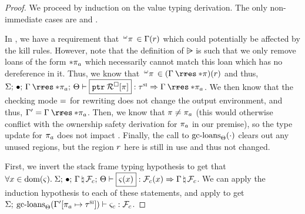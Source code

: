 \begin{proof}
  We proceed by induction on the value typing derivation. The only non-immediate
  cases are  and .

  \vspace{1em}
  \noindent \framebox[\textwidth]{ \figuresize
    \begin{mathpar}
      \TPointer
    \end{mathpar}
  } \vspace{1em}

  In , we have a requirement that
  $\,^{\omega}\pi\, \in \Gamma(r)$ which could
  potentially be affected by the kill rules. However, note that the definition
  of $\rsub$ is such that we only remove loans of the form
  $* \pi_a$ which necessarily cannot match this loan which has no
  dereference in it. Thus, we know that $\oxloanpkg{\oxmuta}{\oxplace} \in
  (\oxrsub{\oxvarctx}{\oxderef{\oxplace}})(\oxcprov)$ and thus,
  $\oxtypjudge{\oxglobalctx}{\oxemptyctx}{\oxkontctx}{
    \oxrsub{\oxvarctx}{\oxderef{\oxplace_a}}
  }{
    \oxptr{\oxreferentctx[\oxplace]}
  }{\oxsitype}{
    \oxrsub{\oxvarctx}{\oxderef{\oxplace_a}}
  }$. We then know that the checking mode $=$ for rewriting does not
  change the output environment, and thus, $\oxvarctx^\prime =
  \oxrsub{\oxvarctx}{\oxderef{\oxplace_a}}$. Then, we know that
  $\pi \neq \pi_a$ (this would otherwise conflict with the ownership
  safety derivation for $\pi_a$ in our premise), so the type update for
  $\pi_a$ does not impact . Finally, the call to
  $\textrm{gc-loans}_{\Theta}(\cdot)$ clears out any unused regions, but the region
  $r$ here is still in use and thus not changed.

  \vspace{1em}
  \noindent \framebox[\textwidth]{ \figuresize
    \begin{mathpar}
      \TClosureVal
    \end{mathpar}
  } \vspace{1em}

  
  First, we invert the stack frame typing hypothesis to get that $\forall \oxid
  \in \oxdomain{\oxstackframe}. \;
  \oxtypjudge{\oxglobalctx}{\oxemptyctx}{\oxkontctx}{
    \oxnewframe{\oxvarctx}{\oxframe_c}
  }{\oxstackframe(\oxid)}{\oxframe_c(\oxid)}
  {\oxnewframe{\oxvarctx}{\oxframe_c}}$.
  We can apply the induction hypothesis to each of these statements, and apply
   to get
  $\Sigma; \: 
      \textrm{gc-loans}_{\Theta}(\Gamma^\prime [\pi_a \mapsto \tau^\textsc{si}])
   \vdash \varsigma_c : \mathcal{F}_c$.


\end{proof}
